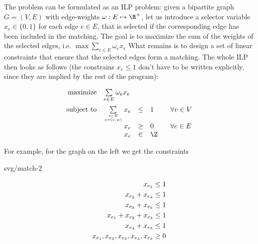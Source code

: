 \noindent The problem \maxWBmatching 
can be formulated as an ILP problem: given a bipartite graph $G=(V,E)$ with edge-weights
$\omega:E\mapsto\R^+$, let us introduce a selector variable  $x_e\in\{0,1\}$ for each edge $e\in E$,
that is selected if the corresponding edge has been included in the matching. The goal is to maximize the sum
of the weights of the selected edges, i.e. 
$\max\sum_{e\in E}\omega_ex_e$
What remains is to design a set of linear constraints that ensure that the selected edges form a matching.
The whole ILP then looks as follows (the constrains $x_e\le1$ don't have to be written explicitly, since
they are implied by the rest of the program):

\begin{equation}
\label{eq:ILPa:1}
\begin{array}{rrcll}
  {\rm maximize}     & \multicolumn{1}{l}{\sum\limits_{e\in E}\omega_ex_e}\\[3ex]
  {\rm subject\ to} & \sum\limits_{e\in E\atop e=(v,w)}x_e&\le&1& \;\;\;\forall v\in V\\
                          & x_e&\ge&0& \;\;\;\forall e\in E\\
                          & x_e&\in&\Z
\end{array}
\end{equation}

\noindent
For example, for the graph on the left we get the constraints\\
\begin{minipage}[t]{0.4\textwidth}
  \vskip 0pt
  \begin{myfig}{0.8\textwidth}{svg/match-2}
\end{myfig}
\end{minipage}
\begin{minipage}[t]{0.6\textwidth}
\vskip 0pt
\begin{align}
  x_{e_1}&\le1\notag\\
  x_{e_2}+x_{e_4}&\le1\notag\\
  x_{e_3}+x_{e_5}&\le1\notag\\
  x_{e_1}+x_{e_2}+x_{e_3}&\le1\label{eq:ILPa:2}\\
  x_{e_4}+x_{e_5}&\le1\notag\\
  x_{e_1},x_{e_2},x_{e_3},x_{e_4},x_{e_5}&\ge0\notag
\end{align}
\end{minipage}

